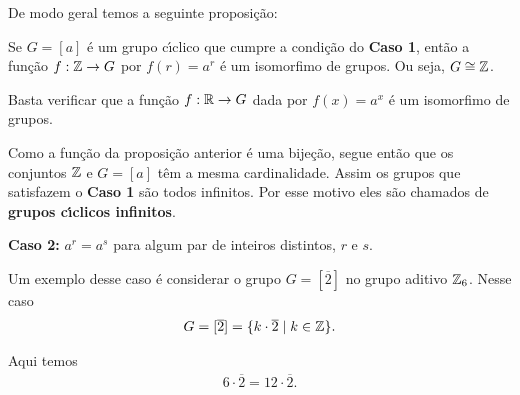 De modo geral temos a seguinte proposi\c{c}\~ao:

\begin{proposicao}
    Se $G = [a]$ \'e um grupo c{\'\i}clico que cumpre a condi\c{c}\~ao do \textbf{Caso 1}, ent\~ao a fun\c{c}\~ao $f : \mathbb{Z} \to G$ por $f(r) = a^r$ \'e um isomorfimo de grupos. Ou seja, $G \cong \mathbb{Z}$.
\end{proposicao}
\begin{prova}
    Basta verificar que a fun\c{c}\~ao $f : \mathbb{R} \to G$ dada por $f(x) = a^x$ \'e um isomorfimo de grupos.
\end{prova}

\begin{observacao}
    Como a fun\c{c}\~ao da proposi\c{c}\~ao anterior \'e uma bije\c{c}\~ao, segue ent\~ao que os conjuntos $\mathbb{Z}$ e $G = [a]$ t\^em a mesma cardinalidade. Assim os grupos que satisfazem o \textbf{Caso 1} s\~ao todos infinitos. Por esse motivo eles s\~ao chamados de \textbf{grupos c{\'\i}clicos infinitos}.
\end{observacao}

\textbf{Caso 2:} $a^r = a^s$ para algum par de inteiros distintos, $r$ e $s$.

Um exemplo desse caso \'e considerar o grupo $G = [\overline{2}]$ no grupo aditivo $\mathbb{Z}_6$. Nesse caso
\begin{align*}
    G = [\overline{2}] = \{k \cdot \overline{2} \mid k \in \mathbb{Z}\}.
\end{align*}

Aqui temos
\begin{align*}
    6\cdot\overline{2} = 12\cdot \overline{2}.
\end{align*}

